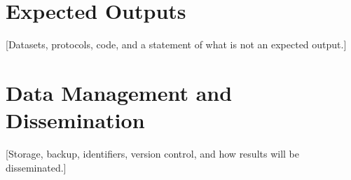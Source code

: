 \section{Expected Outputs}\label{sec:3.10}
{[}Datasets, protocols, code, and a statement of what is not an expected output.]

\section{Data Management and Dissemination}\label{sec:3.11}
{[}Storage, backup, identifiers, version control, and how results will be disseminated.]
